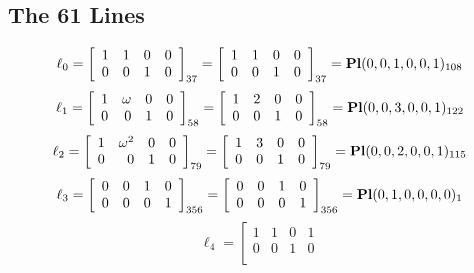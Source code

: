 \documentclass{article}
\begin{document}
{\subsection*{The 61 Lines}
$$
\ell_{0} = 
\left[
\begin{array}{*{4}{r}}
1 & 1 & 0 & 0\\
0 & 0 & 1 & 0\\
\end{array}
\right]
_{37}
=
\left[
\begin{array}{*{4}c}
1  & 1  & 0  & 0\\
0  & 0  & 1  & 0\\
\end{array}
\right]_{37}
={\rm\bf Pl}(0,0,1,0,0,1 )_{108}$$
$$
\ell_{1} = 
\left[
\begin{array}{*{4}{r}}
1 & \omega  & 0 & 0\\
0 & 0 & 1 & 0\\
\end{array}
\right]
_{58}
=
\left[
\begin{array}{*{4}c}
1  & 2  & 0  & 0\\
0  & 0  & 1  & 0\\
\end{array}
\right]_{58}
={\rm\bf Pl}(0,0,3,0,0,1 )_{122}$$
$$
\ell_{2} = 
\left[
\begin{array}{*{4}{r}}
1 & \omega^{2} & 0 & 0\\
0 & 0 & 1 & 0\\
\end{array}
\right]
_{79}
=
\left[
\begin{array}{*{4}c}
1  & 3  & 0  & 0\\
0  & 0  & 1  & 0\\
\end{array}
\right]_{79}
={\rm\bf Pl}(0,0,2,0,0,1 )_{115}$$
$$
\ell_{3} = 
\left[
\begin{array}{*{4}{r}}
0 & 0 & 1 & 0\\
0 & 0 & 0 & 1\\
\end{array}
\right]
_{356}
=
\left[
\begin{array}{*{4}c}
0  & 0  & 1  & 0\\
0  & 0  & 0  & 1\\
\end{array}
\right]_{356}
={\rm\bf Pl}(0,1,0,0,0,0 )_{1}$$
$$
\ell_{4} = 
\left[
\begin{array}{*{4}{r}}
1 & 1 & 0 & 1\\
0 & 0 & 1 & 0\\

\end{array}$$}
\end{document}
